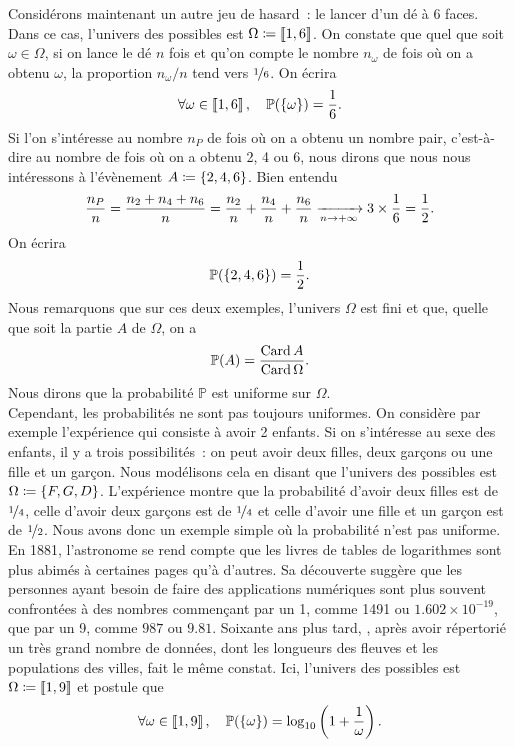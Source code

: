 \documentclass{magnolia}
\begin{document}
Considérons maintenant un autre jeu de hasard~: le lancer d'un dé à 6 faces. Dans ce cas,
l'univers des possibles est $\Omega\coloneqq\left\llbracket 1,6\right\rrbracket$. On constate que quel que
soit $\omega\in\Omega$, si on lance le dé $n$ fois et qu'on compte le nombre $n_\omega$ de
fois où on a obtenu $\omega$, la proportion $n_\omega/n$ tend vers $\nicefrac{1}{6}$. On écrira
\[\forall \omega\in\left\llbracket 1,6\right\rrbracket,\quad \mathbb{P}(\left\{\omega\right\})=\frac{1}{6}.\]
Si l'on s'intéresse au nombre $n_P$ de fois où on a obtenu un nombre pair, c'est-à-dire au
nombre de fois où on a obtenu 2, 4 ou 6, nous dirons que nous nous intéressons à l'évènement
$A\coloneqq\left\{2,4,6\right\}$. Bien entendu
\[\frac{n_P}{n}=\frac{n_2+n_4+n_6}{n}=\frac{n_2}{n}+\frac{n_4}{n}+\frac{n_6}{n}
  \xrightarrow[n\rightarrow +\infty]{} 3\times\frac{1}{6}=\frac{1}{2}.\]
On écrira 
\[\mathbb{P}(\left\{2, 4, 6\right\})=\frac{1}{2}.\]
Nous remarquons que sur ces deux exemples, l'univers $\Omega$ est fini et que, quelle que soit
la partie $A$ de $\Omega$, on a
\[\mathbb{P}(A)=\frac{\operatorname{Card} A}{\operatorname{Card} \Omega}.\]
Nous dirons que la probabilité $\mathbb{P}$ est uniforme sur $\Omega$.\\

Cependant, les probabilités ne sont pas toujours uniformes. On considère par exemple
l'expérience
qui consiste à avoir 2 enfants. Si on s'intéresse au sexe des enfants, il y a trois
possibilités~: on peut avoir deux filles, deux garçons ou une fille et un garçon. Nous
modélisons cela en disant que l'univers des possibles est $\Omega\coloneqq\left\{F,G,D\right\}$.
L'expérience montre que la probabilité d'avoir deux filles est de $\nicefrac{1}{4}$,
celle d'avoir deux garçons est de $\nicefrac{1}{4}$ et celle d'avoir une fille et un
garçon est de $\nicefrac{1}{2}$. Nous avons donc un exemple simple où la
probabilité n'est pas uniforme.\\

En 1881, l'astronome
 se rend compte que les livres de tables de logarithmes sont plus
abimés à certaines pages qu'à d'autres. Sa découverte suggère que les personnes
ayant besoin de faire des applications numériques sont plus souvent confrontées à des nombres
commençant par un 1, comme 1491 ou $1.602\times 10^{-19}$, que par un 9, comme $987$ ou $9.81$.
Soixante ans plus tard, , après avoir
répertorié un très grand nombre de données, dont les longueurs des fleuves et les populations
des villes, fait le même constat. Ici, l'univers des possibles est $\Omega\coloneqq\left\llbracket 1,9\right\rrbracket$
et  postule que
\[\forall \omega\in\left\llbracket 1,9\right\rrbracket,\quad \mathbb{P}(\left\{\omega\right\})=\log_{10}\left(1+\frac{1}{\omega}\right).\]
\end{document}
